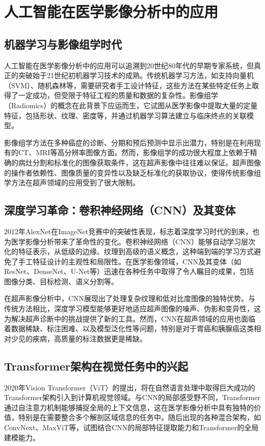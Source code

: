 \section{人工智能在医学影像分析中的应用}

\subsection{机器学习与影像组学时代}

人工智能在医学影像分析中的应用可以追溯到20世纪80年代的早期专家系统，但真正的突破始于21世纪初机器学习技术的成熟。传统机器学习方法，如支持向量机（SVM）、随机森林等，需要研究者手工设计特征，这些方法在某些特定任务上取得了一定成功，但受限于特征工程的质量和数据的复杂性。影像组学（Radiomics）的概念在此背景下应运而生，它试图从医学影像中提取大量的定量特征，包括形状、纹理、密度等，并通过机器学习算法建立与临床终点的关联模型。

影像组学方法在多种癌症的诊断、分期和预后预测中显示出潜力，特别是在利用现有的CT、MRI等高分辨率图像方面。然而，影像组学的成功很大程度上依赖于精确的病灶分割和标准化的图像获取条件，这在超声影像中往往难以保证。超声图像的操作者依赖性、图像质量的变异性以及缺乏标准化的获取协议，使得传统影像组学方法在超声领域的应用受到了很大限制。

\subsection{深度学习革命：卷积神经网络（CNN）及其变体}

2012年AlexNet在ImageNet竞赛中的突破性表现，标志着深度学习时代的到来，也为医学影像分析带来了革命性的变化。卷积神经网络（CNN）能够自动学习层次化的特征表示，从低级的边缘、纹理到高级的语义概念，这种端到端的学习方式避免了手工特征设计的主观性和局限性。在医学影像领域，CNN及其变体（如ResNet、DenseNet、U-Net等）迅速在各种任务中取得了令人瞩目的成果，包括图像分类、目标检测、语义分割等。

在超声影像分析中，CNN展现出了处理复杂纹理和低对比度图像的独特优势。与传统方法相比，深度学习模型能够更好地适应超声图像的噪声、伪影和变异性，这为解决超声诊断中的挑战提供了新的工具。然而，CNN在超声领域的应用也面临着数据稀缺、标注困难、以及模型泛化性等问题，特别是对于胃癌和胰腺癌这类相对少见的疾病，高质量的标注数据更是稀缺。

\subsection{Transformer架构在视觉任务中的兴起}

2020年Vision Transformer（ViT）的提出，将在自然语言处理中取得巨大成功的Transformer架构引入到计算机视觉领域。与CNN的局部感受野不同，Transformer通过自注意力机制能够捕捉全局的上下文信息，这在医学影像分析中具有独特的价值，特别是在需要整合多个解剖区域信息的任务中。随后出现的各种混合架构，如ConvNext、MaxViT等，试图结合CNN的局部特征提取能力和Transformer的全局建模能力。


